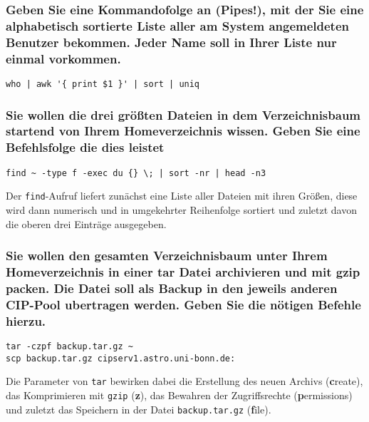 \subsubsection*{Geben Sie eine Kommandofolge an (Pipes!), mit der Sie eine
alphabetisch sortierte Liste aller am System angemeldeten Benutzer bekommen.
Jeder Name soll in Ihrer Liste nur einmal vorkommen.}
\begin{lstlisting}[style=Bash]
who | awk '{ print $1 }' | sort | uniq
\end{lstlisting}

\subsubsection*{Sie wollen die drei größten Dateien in dem Verzeichnisbaum
startend von Ihrem Homeverzeichnis wissen. Geben Sie eine Befehlsfolge die dies
leistet}
\begin{lstlisting}[style=Bash]
find ~ -type f -exec du {} \; | sort -nr | head -n3
\end{lstlisting}
Der \lstinline'find'-Aufruf liefert zunächst eine Liste aller Dateien mit ihren
Größen, diese wird dann numerisch und in umgekehrter Reihenfolge sortiert und
zuletzt davon die oberen drei Einträge ausgegeben.

\subsubsection*{Sie wollen den gesamten Verzeichnisbaum unter Ihrem
Homeverzeichnis in einer tar Datei archivieren und mit gzip packen. Die Datei
soll als Backup in den jeweils anderen CIP-Pool ubertragen werden. Geben Sie die
nötigen Befehle hierzu.}
\begin{lstlisting}[style=Bash]
tar -czpf backup.tar.gz ~
scp backup.tar.gz cipserv1.astro.uni-bonn.de:
\end{lstlisting}
Die Parameter von \lstinline'tar' bewirken dabei die Erstellung des neuen
Archivs (\textbf create), das Komprimieren mit \lstinline'gzip' (\textbf z), das
Bewahren der Zugriffsrechte (\textbf permissions) und zuletzt das Speichern in
der Datei \lstinline'backup.tar.gz' (\textbf file).

